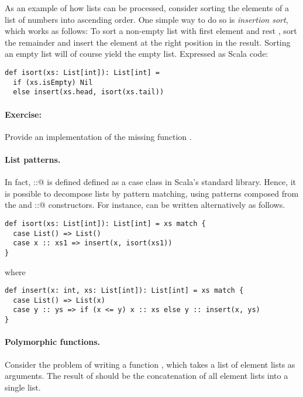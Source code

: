 \documentclass[11pt]{book}
\newcommand{\exercise}{\paragraph{Exercise:}}
\begin{document}
As an example of how lists can be processed, consider sorting the
elements of a list of numbers into ascending order. One simple way to
do so is {\em insertion sort}, which works as follows: To sort a
non-empty list with first element \verb@x@ and rest \verb@xs@, sort
the remainder \verb@xs@ and insert the element \verb@x@ at the right
position in the result. Sorting an empty list will of course yield the
empty list. Expressed as Scala code:
\begin{verbatim}
def isort(xs: List[int]): List[int] =
  if (xs.isEmpty) Nil
  else insert(xs.head, isort(xs.tail))
\end{verbatim}

\exercise Provide an implementation of the missing function
\verb@insert@.

\paragraph{List patterns.} In fact, \verb@::@ is
defined defined as a case class in Scala's standard library. Hence, it
is possible to decompose lists by pattern matching, using patterns
composed from the \verb@Nil@ and \verb@::@ constructors. For instance,
\verb@isort@ can be written alternatively as follows.
\begin{verbatim}
def isort(xs: List[int]): List[int] = xs match {
  case List() => List()
  case x :: xs1 => insert(x, isort(xs1))
}
\end{verbatim}
where
\begin{verbatim}
def insert(x: int, xs: List[int]): List[int] = xs match {
  case List() => List(x)
  case y :: ys => if (x <= y) x :: xs else y :: insert(x, ys)
}
\end{verbatim}

\paragraph{Polymorphic functions.} Consider the problem of writing a
  function \verb@concat@, which takes a list of element lists as
  arguments. The result of \verb@concat@ should be the concatenation of all
  element lists into a single list. 
\end{document}
